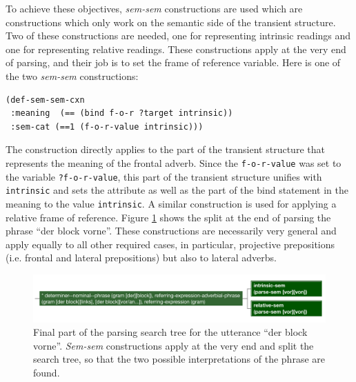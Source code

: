 To achieve these objectives, \emph{sem-sem} constructions are used which
are constructions which only work on the semantic side of the transient structure.
Two of these constructions are needed, one for representing intrinsic readings and 
one for representing relative readings. 
These constructions apply at the very end of parsing, and their job is to set the frame of reference variable.
Here is one of the two \emph{sem-sem} constructions:
\begin{example}
\label{e:def-sem-sem-intrinsic}
\begin{footnotesize}
\begin{Verbatim}[commandchars=\\\{\}]
(def-sem-sem-cxn 
 :meaning  (== (bind f-o-r ?target intrinsic))
 :sem-cat (==1 (f-o-r-value intrinsic)))
\end{Verbatim}
\end{footnotesize}
\end{example}
The construction directly applies to the part of the transient 
structure that represents the meaning of the frontal
adverb. Since the {\footnotesize\tt f-o-r-value} was set to the variable {\footnotesize\tt ?f-o-r-value}, this part of the 
transient structure unifies with {\footnotesize\tt intrinsic} and sets the attribute 
as well as the part of the bind statement
in the meaning to the value {\footnotesize\tt intrinsic}. A similar construction is 
used for applying a relative frame of reference. Figure 
\ref{f:parsing-search-tree-der-block-vorne} shows the split at the end 
of parsing the phrase ``der block vorne''.
These constructions are necessarily very general and apply equally to 
all other required cases, in particular, projective prepositions (i.e. frontal and 
lateral prepositions) but also to lateral adverbs.

\begin{figure}
\begin{center}
\includegraphics[width=\columnwidth]{figs/parsing-search-tree-der-block-vorne} 
\caption[Parsing semantically ambiguous phrases]{
Final part of the parsing search tree for the utterance ``der block vorne''. 
\emph{Sem-sem} constructions apply at the very end and split the search tree, so 
that the two possible interpretations of the phrase are found.}
\label{f:parsing-search-tree-der-block-vorne}
\end{center}
\end{figure}

